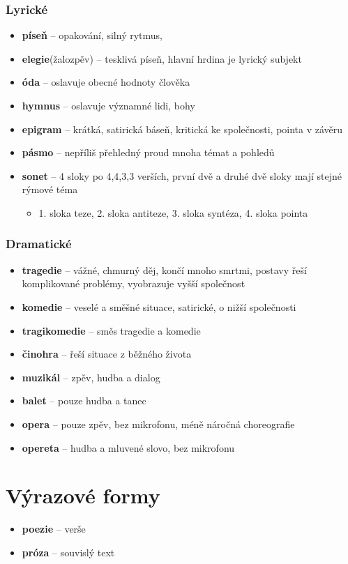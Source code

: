 \subsubsection{Lyrické}
\begin{itemize}
\item[] \textbf{píseň} -- opakování, silný rytmus, 
\item[] \textbf{elegie}(žalozpěv) -- tesklivá píseň, hlavní hrdina je lyrický subjekt
\item[] \textbf{óda} -- oslavuje obecné hodnoty člověka
\item[] \textbf{hymnus} -- oslavuje významné lidi, bohy
\item[] \textbf{epigram} -- krátká, satirická báseň, kritická ke společnosti, pointa v závěru
\item[] \textbf{pásmo} -- nepříliš přehledný proud mnoha témat a pohledů 
\item[] \textbf{sonet} -- 4 sloky po 4,4,3,3 verších, první dvě a druhé dvě sloky mají stejné rýmové téma
\begin{itemize}
\item 1. sloka teze, 2. sloka antiteze, 3. sloka syntéza, 4. sloka pointa
\end{itemize}
\end{itemize}

\subsubsection{Dramatické}
\begin{itemize}
\item[] \textbf{tragedie} -- vážné, chmurný děj, končí mnoho smrtmi, postavy řeší komplikované problémy, vyobrazuje vyšší společnost
\item[] \textbf{komedie} -- veselé a směšné situace, satirické, o nižší společnosti
\item[] \textbf{tragikomedie} -- směs tragedie a komedie
\item[] \textbf{činohra} -- řeší situace z běžného života
\item[] \textbf{muzikál} -- zpěv, hudba a dialog
\item[] \textbf{balet} -- pouze hudba a tanec
\item[] \textbf{opera} -- pouze zpěv, bez mikrofonu, méně náročná choreografie
\item[] \textbf{opereta} -- hudba a mluvené slovo, bez mikrofonu
\end{itemize}


\section{Výrazové formy}
\begin{itemize}
\item[] \textbf{poezie} -- verše
\item[] \textbf{próza} -- souvislý text
\end{itemize}

